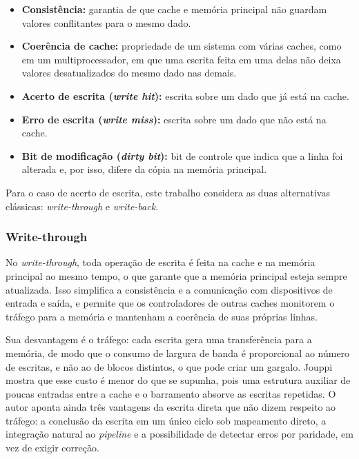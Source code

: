 \documentclass[12pt]{article}
\begin{document}
\begin{itemize}
  \renewcommand{\labelitemi}{$\triangleright$}
  \setlength{\itemsep}{3pt}

  \item \textbf{Consistência:} garantia de que cache e memória principal
  não guardam valores conflitantes para o mesmo dado.

  \item \textbf{Coerência de cache:} propriedade de um sistema com várias
  caches, como em um multiprocessador, em que uma escrita feita em uma delas
  não deixa valores desatualizados do mesmo dado nas demais.

  \item \textbf{Acerto de escrita (\textit{write hit}):} escrita sobre um
  dado que já está na cache.

  \item \textbf{Erro de escrita (\textit{write miss}):} escrita sobre um
  dado que não está na cache.

  \item \textbf{Bit de modificação (\textit{dirty bit}):} bit de controle
  que indica que a linha foi alterada e, por isso, difere da cópia na
  memória principal.
\end{itemize}

Para o caso de acerto de escrita, este trabalho considera as duas
alternativas clássicas: \textit{write-through} e \textit{write-back}.

\subsubsection{Write-through}

No \textit{write-through}, toda operação de escrita é feita na cache e na
memória principal ao mesmo tempo, o que garante que a memória principal
esteja sempre atualizada. Isso simplifica a consistência e a comunicação com
dispositivos de entrada e saída, e permite que os controladores de outras
caches monitorem o tráfego para a memória e mantenham a coerência de suas
próprias linhas.

Sua desvantagem é o tráfego: cada escrita gera uma transferência para a
memória, de modo que o consumo de largura de banda é proporcional ao número
de escritas, e não ao de blocos distintos, o que pode criar um gargalo.
Jouppi \cite{jouppi1993} mostra que esse custo é menor do que se supunha, pois uma
estrutura auxiliar de poucas entradas entre a cache e o barramento absorve
as escritas repetidas. O autor aponta ainda três vantagens da escrita direta
que não dizem respeito ao tráfego: a conclusão da escrita em um único ciclo
sob mapeamento direto, a integração natural ao \textit{pipeline} e a
possibilidade de detectar erros por paridade, em vez de exigir correção.
\end{document}
